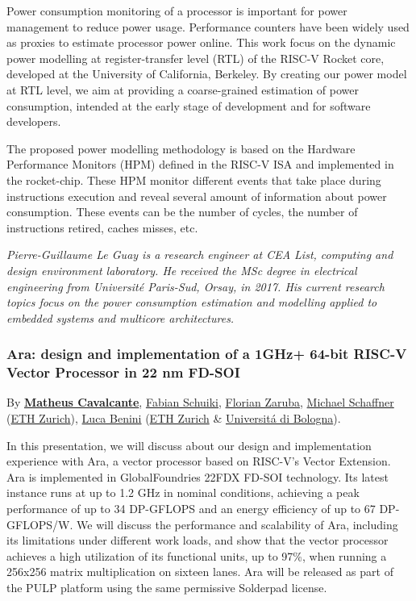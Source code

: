 \documentclass[a4paper, 10pt]{article}
\begin{document}
{Power consumption monitoring of a processor is important for power
management to reduce power usage. Performance counters have been widely
used as proxies to estimate processor power online. This work focus on
the dynamic power modelling at register-transfer level (RTL) of the
RISC-V Rocket core, developed at the University of California, Berkeley.
By creating our power model at RTL level, we aim at providing a
coarse-grained estimation of power consumption, intended at the early
stage of development and for software developers.

The proposed power modelling methodology is based on the Hardware
Performance Monitors (HPM) defined in the RISC-V ISA and implemented in
the rocket-chip. These HPM monitor different events that take place
during instructions execution and reveal several amount of information
about power consumption. These events can be the number of cycles, the
number of instructions retired, caches misses, etc.

\emph{\footnotesize Pierre-Guillaume Le Guay is a research engineer at CEA List, computing and design environment laboratory. He received the MSc degree in electrical engineering from Université Paris-Sud, Orsay, in 2017. His current research topics focus on the power consumption estimation and modelling applied to embedded systems and multicore architectures.}

\subsubsection{Ara: design and implementation of a 1GHz+ 64-bit RISC-V Vector Processor in 22 nm FD-SOI}
\label{sec:org555c581}
By \textbf{\href{mailto:matheusd@iis.ee.ethz.ch}{Matheus Cavalcante}},
\href{mailto:fschuiki@iis.ee.ethz.ch}{Fabian Schuiki},
\href{mailto:zarubaf@iis.ee.ethz.ch}{Florian Zaruba},
\href{mailto:mschaffner@iis.ee.ethz.ch}{Michael Schaffner}
(\href{https://iis.ee.ethz.ch}{ETH Zurich}),
\href{mailto:lbenini@iis.ee.ethz.ch}{Luca Benini}
(\href{https://iis.ee.ethz.ch}{ETH Zurich} \&
\href{http://www.dei.unibo.it}{Universitá di Bologna}).

In this presentation, we will discuss about our design and
implementation experience with Ara, a vector processor based on RISC-V's
Vector Extension. Ara is implemented in GlobalFoundries 22FDX FD-SOI
technology. Its latest instance runs at up to 1.2 GHz in nominal
conditions, achieving a peak performance of up to 34 DP-GFLOPS and an
energy efficiency of up to 67 DP-GFLOPS/W. We will discuss the
performance and scalability of Ara, including its limitations under
different work loads, and show that the vector processor achieves a high
utilization of its functional units, up to 97\%, when running a 256x256
matrix multiplication on sixteen lanes. Ara will be released as part of
the PULP platform using the same permissive Solderpad license.

}
\end{document}
